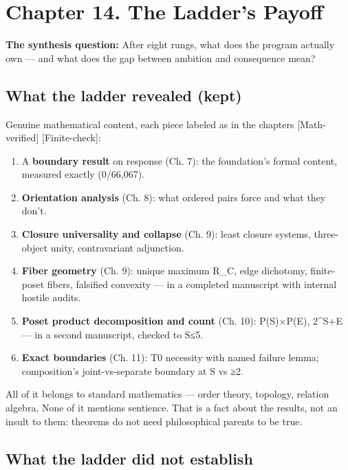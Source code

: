 \documentclass[
  11pt,
]{book}
\providecommand{\tightlist}{%
  \setlength{\itemsep}{0pt}\setlength{\parskip}{0pt}}
\begin{document}
\chapter{Chapter 14. The Ladder's
Payoff}\label{chapter-14.-the-ladders-payoff}

\textbf{The synthesis question:} After eight rungs, what does the
program actually own --- and what does the gap between ambition and
consequence mean?

\section{What the ladder revealed
(kept)}\label{what-the-ladder-revealed-kept}

Genuine mathematical content, each piece labeled as in the chapters
{[}Math-verified{]} {[}Finite-check{]}:

\begin{enumerate}
\def\labelenumi{\arabic{enumi}.}
\tightlist
\item
  A \textbf{boundary result} on response (Ch. 7): the foundation's
  formal content, measured exactly (0/66,067).
\item
  \textbf{Orientation analysis} (Ch. 8): what ordered pairs force and
  what they don't.
\item
  \textbf{Closure universality and collapse} (Ch. 9): least closure
  systems, three-object unity, contravariant adjunction.
\item
  \textbf{Fiber geometry} (Ch. 9): unique maximum R\_C, edge dichotomy,
  finite-poset fibers, falsified convexity --- in a completed manuscript
  with internal hostile audits.
\item
  \textbf{Poset product decomposition and count} (Ch. 10): P(S)×P(E),
  2\^{}\textbar S\textbar+\textbar E\textbar{} --- in a second
  manuscript, checked to \textbar S\textbar≤5.
\item
  \textbf{Exact boundaries} (Ch. 11): T0 necessity with named failure
  lemma; composition's joint-vs-separate boundary at
  \textbar S vs ≥2.
\end{enumerate}

All of it belongs to standard mathematics --- order theory, topology,
relation algebra. None of it mentions sentience. That is a fact about
the results, not an insult to them: theorems do not need philosophical
parents to be true.

\section{What the ladder did not
establish}\label{what-the-ladder-did-not-establish}
\end{document}
